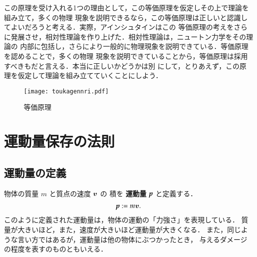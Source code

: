             この原理を受け入れる1つの理由として，この等価原理を仮定しその上で理論を組み立て，多くの物理
            現象を説明できるなら，この等価原理は正しいと認識してよいだろうと考える．実際，アインシュタインはこの
            等価原理の考えをさらに発展させ，相対性理論を作り上げた．相対性理論は，ニュートン力学をその理論の
            内部に包括し，さらにより一般的に物理現象を説明できている．等価原理を認めることで，多くの物理
            現象を説明できていることから，等価原理は採用すべきもだと言える．本当に正しいかどうかは別
            にして，とりあえず，この原理を仮定して理論を組み立てていくことにしよう．
            \begin{figure}[hbt]
                \begin{center}
                    \texttt{[image: toukagennri.pdf]}
                    \caption{等価原理}
                    \label{fig:toukagennri}
                \end{center}
            \end{figure}

    \section{運動量保存の法則}
        \subsection{運動量の定義}
            物体の質量 $m$ と質点の速度 $\boldsymbol{v}$ の
            積を \textbf{運動量} $\textit{\textbf{p}}$ と定義する．
                \begin{align}
                    \textit{\textbf{p}} := m \boldsymbol{v}.
                \end{align}
            このように定義された運動量は，物体の運動の「力強さ」を表現している．
            質量が大きいほど，また，速度が大きいほど運動量が大きくなる．
            また，同じような言い方ではあるが，運動量は他の物体にぶつかったとき，
            与えるダメージの程度を表すのものともいえる．

